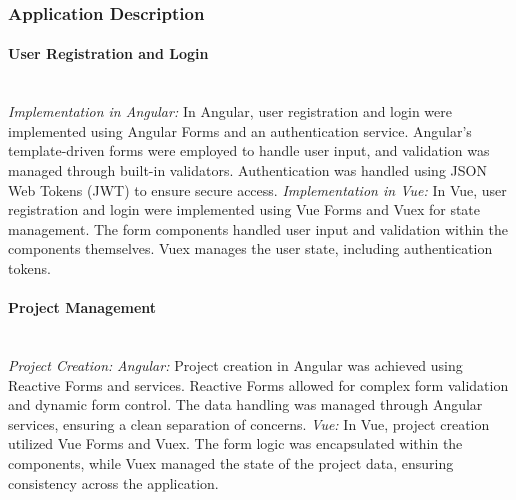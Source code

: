\documentclass[conference]{IEEEtran}
\begin{document}
\subsubsection{Application Description}
\paragraph{User Registration and Login}
\textit{\\Implementation in Angular: }In Angular, user registration and login were implemented using Angular Forms and an authentication service. Angular's template-driven forms were employed to handle user input, and validation was managed through built-in validators. Authentication was handled using JSON Web Tokens (JWT) to ensure secure access.\newline
\textit{Implementation in Vue: }In Vue, user registration and login were implemented using Vue Forms and Vuex for state management. The form components handled user input and validation within the components themselves. Vuex manages the user state, including authentication tokens.
\newline
\paragraph{Project Management}
\textit{\\Project Creation:\newline}
\textit{Angular: }Project creation in Angular was achieved using Reactive Forms and services. Reactive Forms allowed for complex form validation and dynamic form control. The data handling was managed through Angular services, ensuring a clean separation of concerns.
\newline\textit{Vue: }In Vue, project creation utilized Vue Forms and Vuex. The form logic was encapsulated within the components, while Vuex managed the state of the project data, ensuring consistency across the application.
\end{document}
